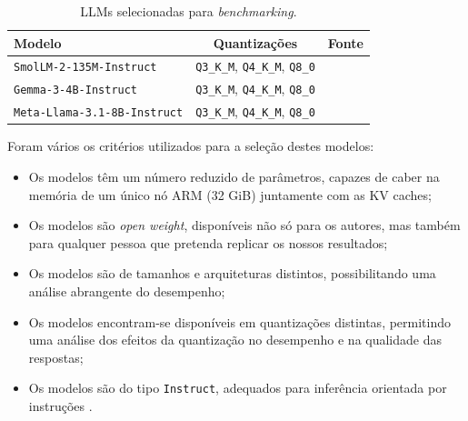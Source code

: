 \documentclass[11pt, a4paper]{article}
\begin{document}
\begin{table}[H]
    \centering
    \begin{tabular}{|l|c|c|}
        \hline
        \textbf{Modelo}       &
        \textbf{Quantizações} &
        \textbf{Fonte}        \\ \hline

        \texttt{SmolLM-2-135M-Instruct}                      &
        \texttt{Q3\_K\_M}, \texttt{Q4\_K\_M}, \texttt{Q8\_0} &
        \cite{smollm2}                                       \\ \hline

        \texttt{Gemma-3-4B-Instruct} &
        \texttt{Q3\_K\_M}, \texttt{Q4\_K\_M}, \texttt{Q8\_0} &
        \cite{gemma3}                                        \\ \hline

        \texttt{Meta-Llama-3.1-8B-Instruct}                  &
        \texttt{Q3\_K\_M}, \texttt{Q4\_K\_M}, \texttt{Q8\_0} &
        \cite{llama}                                         \\ \hline
    \end{tabular}

    \caption{LLMs selecionadas para \emph{benchmarking}.}
    \label{models}
\end{table}

Foram vários os critérios utilizados para a seleção destes modelos:

\begin{itemize}
    \item Os modelos têm um número reduzido de parâmetros, capazes de caber na memória de um único
          nó ARM (32 GiB) juntamente com as KV caches;

    \item Os modelos são \emph{open weight}, disponíveis não só para os autores, mas também para
          qualquer pessoa que pretenda replicar os nossos resultados;

    \item Os modelos são de tamanhos e arquiteturas distintos, possibilitando uma análise abrangente
          do desempenho;

    \item Os modelos encontram-se disponíveis em quantizações distintas, permitindo uma análise dos
          efeitos da quantização no desempenho e na qualidade das respostas;

    \item Os modelos são do tipo \texttt{Instruct}, adequados para inferência orientada por
          instruções \cite{instruct}.
\end{itemize}
\end{document}
